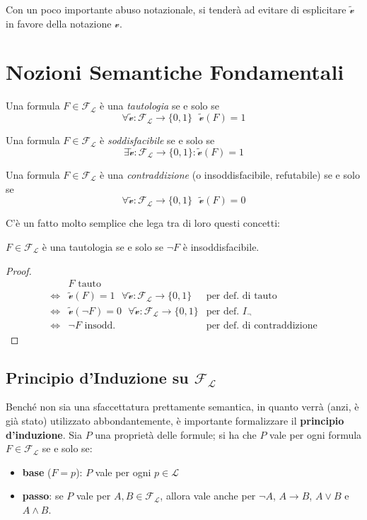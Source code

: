 Con un poco importante abuso notazionale, si tenderà ad evitare di esplicitare 
$\widetilde{\mathcal{v}}$ in favore della notazione $\mathcal{v}$.
\section{Nozioni Semantiche Fondamentali}

\begin{defi}[Tautologia]
Una formula $F \in \mathscr{F_L}$ è una \textit{tautologia} se e solo se 
$$
\forall \widetilde{\mathcal{v}} : \mathscr{F_L} \rightarrow \{0,1\} ~~~ \widetilde{\mathcal{v}}(F) = 1
$$
\end{defi}
\begin{defi}
Una formula $F \in \mathscr{F_L}$ è \textit{soddisfacibile} se e solo se 
$$
\exists \widetilde{\mathcal{v}} : \mathscr{F_L} \rightarrow \{0,1\} : \widetilde{\mathcal{v}}(F) = 1
$$
\end{defi}
\begin{defi}[Contraddizione]
Una formula $F \in \mathscr{F_L}$ è una \textit{contraddizione} (o insoddisfacibile, refutabile) se e solo 
se 
$$
\forall \widetilde{\mathcal{v}} : \mathscr{F_L} \rightarrow \{0,1\} ~~~ \widetilde{\mathcal{v}}(F) = 0
$$
\end{defi}
C'è un fatto molto semplice che lega tra di loro questi concetti: 
\begin{teo}
$F \in \mathscr{F_L}$ è una tautologia se e solo se $\neg F$ è insoddisfacibile. 
\end{teo}
\begin{proof}
  \begin{align*}
         & F \text{ tauto} \\
    \iff & \widetilde{\mathcal{v}}(F) = 1 ~~~ \forall \widetilde{\mathcal{v}} : \mathscr{F_L} \rightarrow \{0,1\} & \text{per def. di tauto}\\
    \iff & \widetilde{\mathcal{v}}(\neg F) = 0 ~~~ \forall \widetilde{\mathcal{v}} : \mathscr{F_L} \rightarrow \{0,1\} & \text{per def. } I_{\neg} \\
    \iff & \neg F \text{ insodd.} & \text{per def. di contraddizione}
  \end{align*}
\end{proof}

\subsection{Principio d'Induzione su $\mathscr{F_L}$}
Benché non sia una sfaccettatura prettamente semantica, in quanto verrà (anzi, è già stato) utilizzato abbondantemente, è importante formalizzare il  \textbf{principio d'induzione}. Sia $P$ una proprietà delle formule; si ha che $P$ vale per ogni formula $F \in \mathscr{F_L}$ se e solo se:
\begin{itemize}
  \item \textbf{base} ($F = p$): $P$ vale per ogni $p \in \mathscr{L}$
  \item \textbf{passo}: se $P$ vale per $A,B  \in \mathscr{F_L}$, allora 
    vale anche per $\neg A$, $A \rightarrow B$, $A \lor B$ e $A \land B$. 
\end{itemize}

